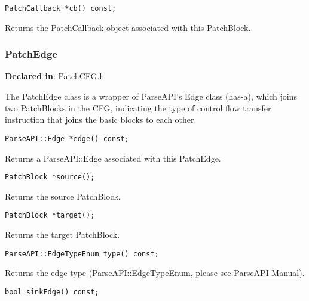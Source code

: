 \begin{verbatim}
PatchCallback *cb() const;

\end{verbatim}



Returns the PatchCallback object associated with this PatchBlock.

\subsubsection{PatchEdge}
\label{sec-3.2.11}

\textbf{Declared in}: PatchCFG.h

The PatchEdge class is a wrapper of ParseAPI's Edge class (has-a), which joins
two PatchBlocks in the CFG, indicating the type of control flow transfer
instruction that joins the basic blocks to each other.


\begin{verbatim}
ParseAPI::Edge *edge() const;

\end{verbatim}



Returns a ParseAPI::Edge associated with this PatchEdge.


\begin{verbatim}
PatchBlock *source();

\end{verbatim}



Returns the source PatchBlock.


\begin{verbatim}
PatchBlock *target();

\end{verbatim}



Returns the target PatchBlock.


\begin{verbatim}
ParseAPI::EdgeTypeEnum type() const;

\end{verbatim}



Returns the edge type (ParseAPI::EdgeTypeEnum, please see \href{ftp://ftp.cs.wisc.edu/paradyn/releases/release7.0/doc/parseapi.pdf}{ParseAPI Manual}).


\begin{verbatim}
bool sinkEdge() const;

\end{verbatim}



